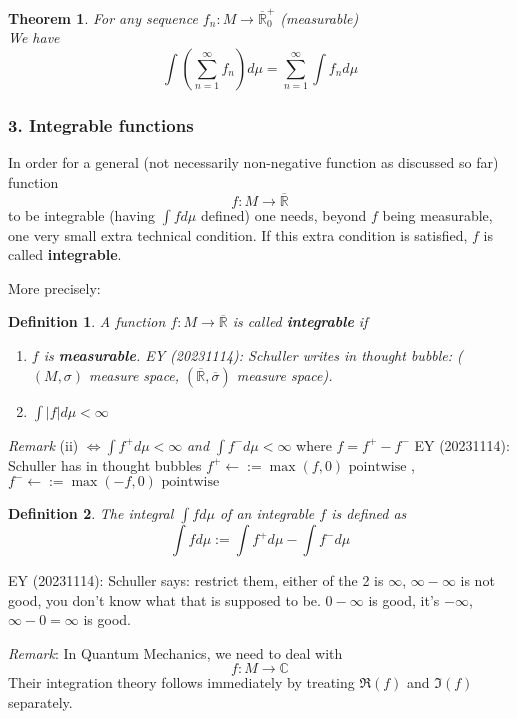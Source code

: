 \documentclass[10pt]{amsart}
\newtheorem{theorem}{Theorem}
\newtheorem{definition}{Definition}
\begin{document}
\begin{multicols*}{2}
\begin{theorem}
	For any sequence $f_n:M \to \overline{\mathbb{R}}_0^+$ (measurable) \\
	We have
	\[
	\int \left( \sum_{n=1}^{\infty} f_n \right) d\mu = \sum_{n=1}^{\infty} \int f_n d\mu
	\]
\end{theorem}

\subsubsection{3. Integrable functions}

In order for a general (not necessarily non-negative function as discussed so far) function
\[
f: M \to \overline{\mathbb{R}}
\]
to be integrable (having $\int f d\mu$ defined) one needs, beyond $f$ being measurable, one very small extra technical condition. If this extra condition is satisfied, $f$ is called \textbf{integrable}.

More precisely:

\begin{definition}
	A function $f: M \to \overline{\mathbb{R}}$ is called \textbf{integrable} if 
	\begin{enumerate}
		\item[(i)] $f$ is \textbf{measurable}. EY (20231114): Schuller writes in thought bubble: ($(M, \sigma)$ measure space, $(\overline{\mathbb{R}}, \overline{\sigma})$ measure space).
		\item[(ii)] $\int |f| d\mu < \infty$
	\end{enumerate} 
\end{definition}

\emph{Remark} (ii) $\Longleftrightarrow \int f^+ d\mu < \infty$ \emph{and} $\int f^- d\mu < \infty$ where $f = f^+ - f^-$ EY (20231114): Schuller has in thought bubbles $f^+ \leftarrow := \max{(f,0)} \text{ pointwise }$, $f^- \leftarrow := \max{(-f, 0)} \text{ pointwise }$

\begin{definition} The integral $\int fd\mu$ of an \emph{integrable} $f$ is defined as 
	\[
	\int f d\mu := \int f^+ d\mu - \int f^- d\mu
	\]
\end{definition}
EY (20231114): Schuller says: restrict them, either of the 2 is $\infty$, $\infty - \infty$ is not good, you don't know what that is supposed to be. $0 - \infty$ is good, it's $-\infty$, $\infty - 0 = \infty$ is good.

\emph{Remark}: In Quantum Mechanics, we need to deal with 
\[
f: M \to \mathbb{C}
\]
Their integration theory follows immediately by treating $\Re{(f)}$ and $\Im{(f)}$ separately.


\end{multicols*}
\end{document}
